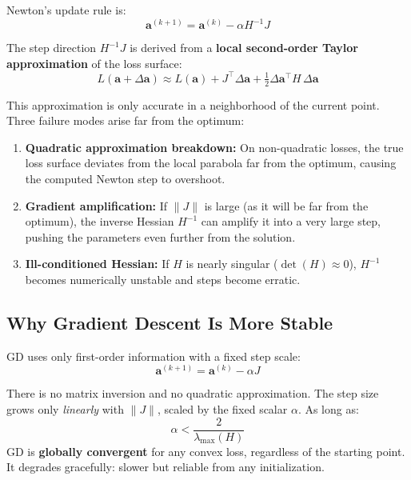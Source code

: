 \documentclass[12pt,a4paper]{article}
\begin{document}
Newton's update rule is:
\begin{equation}
    \mathbf{a}^{(k+1)} = \mathbf{a}^{(k)} - \alpha H^{-1} J
\end{equation}

The step direction $H^{-1}J$ is derived from a \textbf{local second-order Taylor
approximation} of the loss surface:
\begin{equation}
    L(\mathbf{a} + \Delta\mathbf{a}) \approx L(\mathbf{a}) + J^\top \Delta\mathbf{a}
    + \tfrac{1}{2} \Delta\mathbf{a}^\top H \,\Delta\mathbf{a}
\end{equation}

This approximation is only accurate in a neighborhood of the current point. Three
failure modes arise far from the optimum:

\begin{enumerate}
    \item \textbf{Quadratic approximation breakdown:} On non-quadratic losses, the true
    loss surface deviates from the local parabola far from the optimum, causing the
    computed Newton step to overshoot.

    \item \textbf{Gradient amplification:} If $\|J\|$ is large (as it will be far from
    the optimum), the inverse Hessian $H^{-1}$ can amplify it into a very large step,
    pushing the parameters even further from the solution.

    \item \textbf{Ill-conditioned Hessian:} If $H$ is nearly singular
    ($\det(H) \approx 0$), $H^{-1}$ becomes numerically unstable and steps become
    erratic.
\end{enumerate}

\subsection{Why Gradient Descent Is More Stable}

GD uses only first-order information with a fixed step scale:
\begin{equation}
    \mathbf{a}^{(k+1)} = \mathbf{a}^{(k)} - \alpha J
\end{equation}

There is no matrix inversion and no quadratic approximation. The step size grows only
\textit{linearly} with $\|J\|$, scaled by the fixed scalar $\alpha$. As long as:
\begin{equation}
    \alpha < \frac{2}{\lambda_{\max}(H)}
\end{equation}
GD is \textbf{globally convergent} for any convex loss, regardless of the starting
point. It degrades gracefully: slower but reliable from any initialization.
\end{document}

